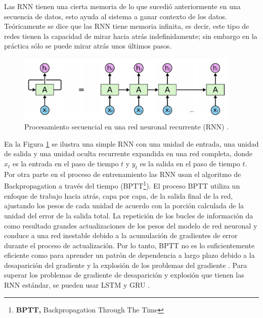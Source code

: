 \vspace{5mm} %

Las RNN tienen una cierta memoria de lo que sucedi\'{o} anteriormente en una secuencia de datos, esto ayuda al sistema a ganar contexto de los datos. Te\'{o}ricamente se dice que las RNN tiene memoria infinita, es decir, este tipo de redes tienen la capacidad de mirar hacia atr\'{a}s indefinidamente; sin embargo en la pr\'{a}ctica s\'{o}lo se puede mirar atr\'{a}s unos \'{u}ltimos pasos.

\begin{figure}[h!]
  \begin{center}	\includegraphics[width=0.95\textwidth]{imagenes/Cap4/rnn}
  \caption{Procesamiento secuencial en una red neuronal recurrente (RNN) \cite{53}.}
  \label{fig:rnn}
  \end{center}
\end{figure}

En la Figura \ref{fig:rnn} se ilustra una simple RNN con una unidad de entrada, una unidad de salida y una unidad oculta recurrente expandida en una red completa, donde $x_{t}$ es la entrada en el paso de tiempo $t$ y $y_{t}$ es la salida en el paso de tiempo $t$. Por otra parte en el proceso de entrenamiento las RNN usan el algoritmo de Backpropagation a trav\'{e}s del tiempo (BPTT\footnote{\textbf{BPTT,} Backpropagation Through The Time}). El proceso BPTT utiliza un enfoque de trabajo hacia atrás, capa por capa, de la salida final de la red, ajustando los pesos de cada unidad de acuerdo con la porción calculada de la unidad del error de la salida total. La repetición de los bucles de información da como resultado grandes actualizaciones de los pesos del modelo de red neuronal y conduce a una red inestable debido a la acumulación de gradientes de error durante el proceso de actualización. Por lo tanto, BPTT no es lo suficientemente eficiente como para aprender un patrón de dependencia a largo plazo debido a la desaparición del gradiente y la explosión de los problemas del gradiente \cite{50}. Para superar los problemas de gradiente de desaparición y explosión que tienen las RNN estándar, se pueden usar LSTM y GRU \cite{51}.

